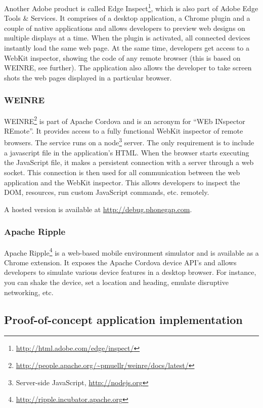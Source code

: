 Another Adobe product is called Edge Inspect\footnote{\url{http://html.adobe.com/edge/inspect/}}, which is also part of Adobe Edge Tools \& Services. It comprises of a desktop application, a Chrome plugin and a couple of native applications and allows developers to preview web designs on multiple displays at a time. When the plugin is activated, all connected devices instantly load the same web page. At the same time, developers get access to a WebKit inspector, showing the code of any remote browser (this is based on WEINRE, see further). The application also allows the developer to take screen shots the web pages displayed in a particular browser.

\subsubsection{WEINRE}

WEINRE\footnote{\url{http://people.apache.org/~pmuellr/weinre/docs/latest/}} is part of Apache Cordova and is an acronym for ``WEb INspector REmote''. It provides access to a fully functional WebKit inspector of remote browsers. The service runs on a node\footnote{Server-side JavaScript, \url{http://nodejs.org}} server. The only requirement is to include a javascript file in the application's HTML. When the browser starts executing the JavaScript file, it makes a persistent connection with a server through a web socket. This connection is then used for all communication between the web application and the WebKit inspector. This allows developers to inspect the DOM, resources, run custom JavaScript commands, etc. remotely.

A hosted version is available at \url{http://debug.phonegap.com}.

\subsubsection{Apache Ripple}

Apache Ripple\footnote{\url{http://ripple.incubator.apache.org}} is a web-based mobile environment simulator and is available as a Chrome extension. It exposes the Apache Cordova device API's and allows developers to simulate various device features in a desktop browser. For instance, you can shake the device, set a location and heading, emulate disruptive networking, etc.

\subsection{Proof-of-concept application implementation}

